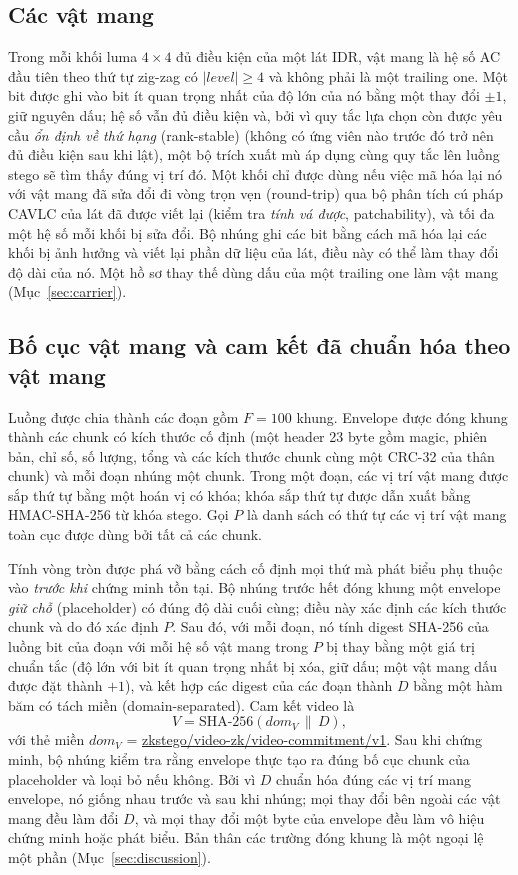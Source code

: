 \documentclass[journal]{IEEEtran}
\begin{document}
\subsection{Các vật mang}
\label{sec:carriers}
Trong mỗi khối luma $4\times4$ đủ điều kiện của một lát IDR, vật mang là hệ số
AC đầu tiên theo thứ tự zig-zag có $|\mathit{level}|\ge4$ và không phải là một
trailing one. Một bit được ghi vào bit ít quan trọng nhất của độ lớn của nó
bằng một thay đổi $\pm1$, giữ nguyên dấu; hệ số vẫn đủ điều kiện và, bởi vì quy
tắc lựa chọn còn được yêu cầu \emph{ổn định về thứ hạng} (rank-stable) (không có
ứng viên nào trước đó trở nên đủ điều kiện sau khi lật), một bộ trích xuất mù áp
dụng cùng quy tắc lên luồng stego sẽ tìm thấy đúng vị trí đó. Một khối chỉ được
dùng nếu việc mã hóa lại nó với vật mang đã sửa đổi đi vòng trọn vẹn (round-trip)
qua bộ phân tích cú pháp CAVLC của lát đã được viết lại (kiểm tra \emph{tính vá
được}, patchability), và tối đa một hệ số mỗi khối bị sửa đổi. Bộ nhúng ghi các
bit bằng cách mã hóa lại các khối bị ảnh hưởng và viết lại phần dữ liệu của lát,
điều này có thể làm thay đổi độ dài của nó. Một hồ sơ thay thế dùng dấu của một
trailing one làm vật mang (Mục~\ref{sec:carrier}).

\subsection{Bố cục vật mang và cam kết đã chuẩn hóa theo vật mang}
\label{sec:order}
Luồng được chia thành các đoạn gồm $F=100$ khung. Envelope được đóng khung
thành các chunk có kích thước cố định (một header 23 byte gồm magic, phiên bản,
chỉ số, số lượng, tổng và các kích thước chunk cùng một CRC-32 của thân chunk)
và mỗi đoạn nhúng một chunk. Trong một đoạn, các vị trí vật mang được sắp thứ tự
bằng một hoán vị có khóa; khóa sắp thứ tự được dẫn xuất bằng HMAC-SHA-256 từ
khóa stego. Gọi $P$ là danh sách có thứ tự các vị trí vật mang toàn cục được
dùng bởi tất cả các chunk.

Tính vòng tròn được phá vỡ bằng cách cố định mọi thứ mà phát biểu phụ thuộc vào
\emph{trước khi} chứng minh tồn tại. Bộ nhúng trước hết đóng khung một envelope
\emph{giữ chỗ} (placeholder) có đúng độ dài cuối cùng; điều này xác định các
kích thước chunk và do đó xác định $P$. Sau đó, với mỗi đoạn, nó tính digest
SHA-256 của luồng bit của đoạn với mỗi hệ số vật mang trong $P$ bị thay bằng một
giá trị chuẩn tắc (độ lớn với bit ít quan trọng nhất bị xóa, giữ dấu; một vật
mang dấu được đặt thành $+1$), và kết hợp các digest của các đoạn thành $D$ bằng
một hàm băm có tách miền (domain-separated). Cam kết video là
\[
V=\mathrm{SHA\mbox{-}256}(\mathit{dom}_V\,\|\,D),
\]
với thẻ miền $\mathit{dom}_V$ =
\url{zkstego/video-zk/video-commitment/v1}.
Sau khi chứng minh, bộ nhúng kiểm tra rằng envelope thực tạo ra đúng bố cục
chunk của placeholder và loại bỏ nếu không. Bởi vì $D$ chuẩn hóa đúng các vị trí
mang envelope, nó giống nhau trước và sau khi nhúng; mọi thay đổi bên ngoài các
vật mang đều làm đổi $D$, và mọi thay đổi một byte của envelope đều làm vô hiệu
chứng minh hoặc phát biểu. Bản thân các trường đóng khung là một ngoại lệ một
phần (Mục~\ref{sec:discussion}).
\end{document}
